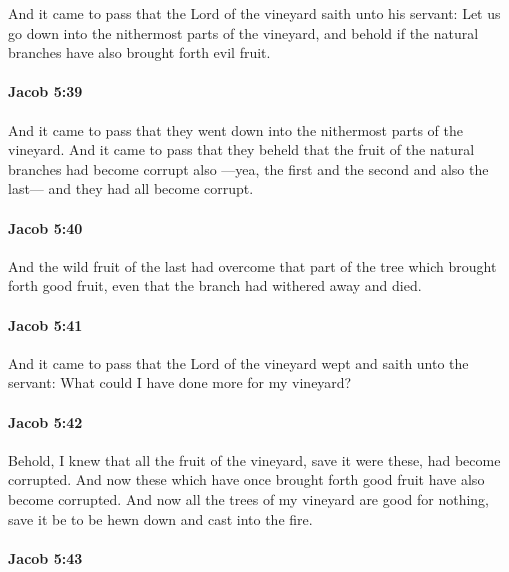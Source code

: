 			And it came to pass that the Lord of the vineyard saith unto his servant:
			Let us go down into the nithermost parts of the vineyard,
			and behold if the natural branches have also brought forth evil fruit.

		\paragraph{Jacob 5:39} %
			\label{JACOB-5-39}

			And it came to pass that they went down into the nithermost parts of the vineyard.
			And it came to pass that they beheld
			that the fruit of the natural branches had become corrupt also
			---yea, the first and the second and also the last---
			and they had all become corrupt.

		\paragraph{Jacob 5:40} %
			\label{JACOB-5-40}

			And the wild fruit of the last had overcome
			that part of the tree which brought forth good fruit,
			even that the branch had withered away and died.

		\paragraph{Jacob 5:41} %
			\label{JACOB-5-41}

			And it came to pass that the Lord of the vineyard wept
			and saith unto the servant:
			What could I have done more for my vineyard?

		\paragraph{Jacob 5:42} %
			\label{JACOB-5-42}

			Behold, I knew that all the fruit of the vineyard,
			save it were these, had become corrupted.
			And now these which have once brought forth good fruit
			have also become corrupted.
			And now all the trees of my vineyard are good for nothing,
			save it be to be hewn down and cast into the fire.

		\paragraph{Jacob 5:43} %
			\label{JACOB-5-43}

